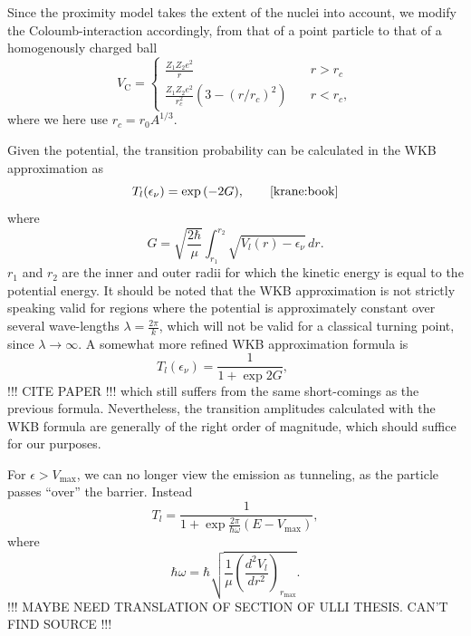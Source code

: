 Since the proximity model takes the extent of the nuclei into account, we modify the Coloumb-interaction accordingly, from that of a point particle to that of a homogenously charged ball
\begin{equation}
V_\text{C} = \begin{cases}\frac{Z_1 Z_2 e^2}{r} &\quad r>r_c \\ \frac{Z_1 Z_2 e^2}{r_c^2}(3-(r/r_c)^2) &\quad r<r_c, \end{cases}
\end{equation}
where we here use $r_c = r_0 A^{1/3}$.


Given the potential, the transition probability can be calculated in the WKB approximation as 
\begin{equation}
T_l(\epsilon_\nu) = \exp{(-2G)},\qquad\cite{krane:book}
\end{equation}
where 
\begin{equation}
G=\sqrt{\frac{2\hbar}{\mu}} \int_{r_1}^{r_2} \sqrt{V_l(r)-\epsilon_{\nu}}\,dr.
\end{equation}
$r_1$ and $r_2$ are the inner and outer radii for which the kinetic energy is equal to the potential energy. It should be noted that the WKB approximation is not strictly speaking valid for regions where the potential is approximately constant over several wave-lengths $\lambda=\frac{2\pi}{k}$, which will not be valid for a classical turning point, since $\lambda \to \infty$. 
A somewhat more refined WKB approximation formula is
\begin{equation}
T_l(\epsilon_\nu) = \frac{1}{1+\exp{2G}},\qquad
\end{equation}
!!! CITE PAPER !!! which still suffers from the same short-comings as the previous formula. Nevertheless, the transition amplitudes calculated with the WKB formula are generally of the right order of magnitude, which should suffice for our purposes\cite{2011arXiv1106.1065N}.

For $\epsilon>V_\text{max}$, we can no longer view the emission as tunneling, as the particle passes ``over'' the barrier. Instead
\begin{equation}
T_l = \frac{1}{1+\exp{\frac{2\pi}{\hbar \omega}(E-V_\text{max})}},
\end{equation}
where
\begin{equation}
\hbar\omega = \hbar\sqrt{\frac{1}{\mu}\left(\frac{d^2V_l}{dr^2}\right)_{r_\text{max}}}.
\end{equation}
!!! MAYBE NEED TRANSLATION OF SECTION OF ULLI THESIS. CAN'T FIND SOURCE !!!

